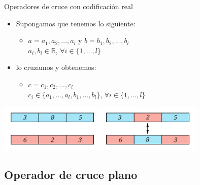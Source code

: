 \documentclass[10pt]{beamer}
\begin{document}
\begin{frame}{Operadores de cruce con codificación real}

		\begin{itemize}
			\item Supongamos que tenemos lo siguiente:
			\begin{itemize}
				\item $a=a_{1} , a_{2}, ... , a_{l}$ y $b=b_{1} , b_{2}, ... , b_{l}$ 
				\\$a_{i},b_{i} \in \mathbb{R}$, $\forall i \in \{1, ... , l\}$
			\end{itemize}
			\item lo cruzamos y obtenemos:
			\begin{itemize}
				\item  $c=c_{1} , c_{2}, ... , c_{l}$
				\\$c_{i} \in \{ a_{1}, ... , a_{l},b_{1}, ... , b_{l} \}$, $\forall i \in \{1, ... , l\}$
			\end{itemize}
			
		\end{itemize}
		
		\begin{center}
			\vspace{5mm}
			\includegraphics[width=10cm]{crucereal}
		\end{center}
		

\end{frame}

\subsection{Operador de cruce plano}
\end{document}
